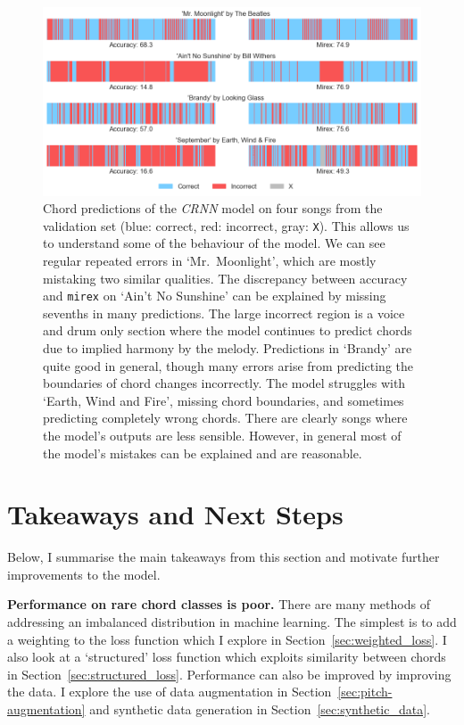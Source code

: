 \begin{figure}[ht]
    \centering
    \includegraphics[width=1.0\textwidth]{figures/chord_recognition_examples.png}
    \caption{Chord predictions of the \emph{CRNN} model on four songs from the validation set (blue: correct, red: incorrect, gray: \texttt{X}). This allows us to understand some of the behaviour of the model. We can see regular repeated errors in `Mr.\ Moonlight', which are mostly mistaking two similar qualities. The discrepancy between accuracy and \texttt{mirex} on `Ain't No Sunshine' can be explained by missing sevenths in many predictions. The large incorrect region is a voice and drum only section where the model continues to predict chords due to implied harmony by the melody. Predictions in `Brandy' are quite good in general, though many errors arise from predicting the boundaries of chord changes incorrectly. The model struggles with `Earth,  Wind and Fire', missing chord boundaries, and sometimes predicting completely wrong chords. There are clearly songs where the model's outputs are less sensible. However, in general most of the model's mistakes can be explained and are reasonable.}\label{fig:crnn_examples}
\end{figure}

\section{Takeaways and Next Steps}

Below, I summarise the main takeaways from this section and motivate further improvements to the model.

\textbf{Performance on rare chord classes is poor.} There are many methods of addressing an imbalanced distribution in machine learning. The simplest is to add a weighting to the loss function which I explore in Section~\ref{sec:weighted_loss}. I also look at a `structured' loss function which exploits similarity between chords in Section~\ref{sec:structured_loss}. Performance can also be improved by improving the data. I explore the use of data augmentation in Section~\ref{sec:pitch-augmentation} and synthetic data generation in Section~\ref{sec:synthetic_data}.

